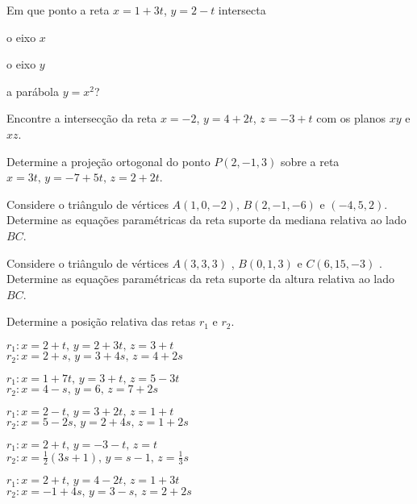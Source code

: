 \item Em que ponto a reta $x = 1 + 3t$, $y = 2 - t$ intersecta
\begin{enumerate}[leftmargin=*]
\begin{multicols}{3}
    \item o eixo $x$
    \item o eixo $y$
    \item a parábola $y=x^2$?
    \end{multicols}
\end{enumerate}
\item Encontre a intersecção da reta $x = -2$, $y = 4 + 2t$, $z = -3 + t$ com os planos $xy$ e $xz$.

\item Determine a projeção ortogonal do ponto $P(2,-1, 3)$ sobre a reta $x=3t,\, y=-7+5t,\, z=2+2t$.


\item Considere o triângulo de vértices $A(1,0,-2)$, $B(2,-1,-6)$ e $(-4, 5, 2)$. Determine as equações paramétricas da reta suporte da mediana relativa ao lado $BC$.

\item Considere o triângulo de vértices  $A(3,3,3)$ , $B(0, 1, 3)$ e $C(6, 15, -3)$ . Determine as equações paramétricas da reta suporte da altura relativa ao lado $BC$.

\item[\textcolor{blue}{56-60}] Determine a posição relativa das retas $r_1$ e $r_2$.

\item $r_1: x = 2 + t,\, y = 2 + 3t,\, z = 3 + t$ \\ $r_2: x = 2 + s, \,y = 3 + 4s,\, z = 4 + 2s$

\item $r_1 : x = 1 + 7t, \,y = 3 + t, \,z = 5 - 3t$\\
$r_2 : x = 4 - s, \,y = 6, \,z = 7 + 2s$    

\item $r_1 : x = 2 -t, \,y = 3 + 2t, \,z = 1 + t$\\
$r_2 : x = 5 - 2s, \,y = 2+4s, \,z = 1 + 2s$ 

\item $r_1 : x = 2 +t, \,y = -3 -t, \,z = t$\\
$r_2 : x = \frac{1}{2}(3s + 1), \,y = s-1, \,z = \frac{1}{3}s$   
\item $r_1 : x = 2 +t, \,y = 4 - 2t, \,z = 1 + 3t$\\
$r_2 : x = -1 + 4s, \,y = 3-s, \,z = 2 + 2s$ 

